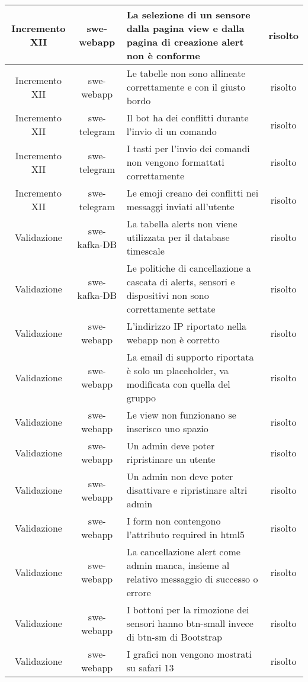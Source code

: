 \begin{center}
\begin{longtable}{|c|c|p{8cm}|c|}
	    Incremento XII & swe-webapp & La selezione di un sensore dalla pagina view e dalla pagina di creazione alert non è conforme & risolto \\
	    \hline
	    Incremento XII & swe-webapp & Le tabelle non sono allineate correttamente e con il giusto bordo & risolto \\
	    \hline
	    Incremento XII & swe-telegram & Il bot ha dei conflitti durante l'invio di un comando & risolto \\
	    \hline
	    Incremento XII & swe-telegram & I tasti per l'invio dei comandi non vengono formattati correttamente & risolto \\
	    \hline
	    Incremento XII & swe-telegram & Le emoji creano dei conflitti nei messaggi inviati all'utente & risolto \\
	    \hline
	    Validazione & swe-kafka-DB & La tabella alerts non viene utilizzata per il database timescale & risolto \\
	    \hline
	    Validazione & swe-kafka-DB & Le politiche di cancellazione a cascata di alerts, sensori e dispositivi non sono correttamente settate & risolto \\
	    \hline
	    Validazione & swe-webapp & L'indirizzo IP riportato nella webapp non è corretto & risolto \\
	    \hline
	    Validazione & swe-webapp & La email di supporto riportata è solo un placeholder, va modificata con quella del gruppo & risolto \\
	    \hline
	    Validazione & swe-webapp & Le view non funzionano se inserisco uno spazio & risolto \\
	    \hline
	    Validazione & swe-webapp & Un admin deve poter ripristinare un utente & risolto \\
	    \hline
	    Validazione & swe-webapp & Un admin non deve poter disattivare e ripristinare altri admin & risolto \\
	    \hline
	    Validazione & swe-webapp & I form non contengono l'attributo required in html5 & risolto \\
	    \hline
	    Validazione & swe-webapp & La cancellazione alert come admin manca, insieme al relativo messaggio di successo o errore & risolto \\
	    \hline
	    Validazione & swe-webapp & I bottoni per la rimozione dei sensori hanno btn-small invece di btn-sm di Bootstrap & risolto \\
	    \hline
	    Validazione & swe-webapp & I grafici non vengono mostrati su safari 13 & risolto \\

\end{longtable}
\end{center}

